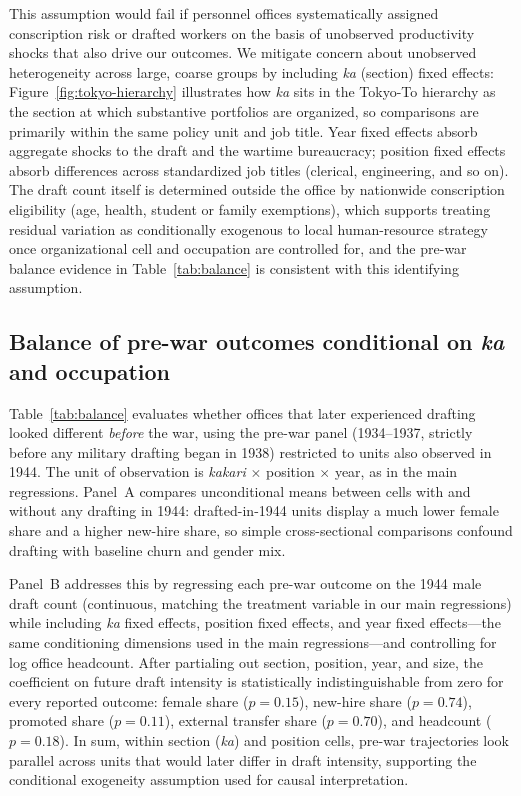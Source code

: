This assumption would fail if personnel offices systematically assigned conscription risk or drafted workers on the basis of unobserved productivity shocks that also drive our outcomes. We mitigate concern about unobserved heterogeneity across large, coarse groups by including \emph{ka} (section) fixed effects: Figure~\ref{fig:tokyo-hierarchy} illustrates how \emph{ka} sits in the Tokyo-To hierarchy as the section at which substantive portfolios are organized, so comparisons are primarily within the same policy unit and job title. Year fixed effects absorb aggregate shocks to the draft and the wartime bureaucracy; position fixed effects absorb differences across standardized job titles (clerical, engineering, and so on). The draft count itself is determined outside the office by nationwide conscription eligibility (age, health, student or family exemptions), which supports treating residual variation as conditionally exogenous to local human-resource strategy once organizational cell and occupation are controlled for, and the pre-war balance evidence in Table~\ref{tab:balance} is consistent with this identifying assumption.

\subsection{Balance of pre-war outcomes conditional on \emph{ka} and occupation}

Table~\ref{tab:balance} evaluates whether offices that later experienced drafting looked different \emph{before} the war, using the pre-war panel (1934--1937, strictly before any military drafting began in 1938) restricted to units also observed in 1944. The unit of observation is \emph{kakari} $\times$ position $\times$ year, as in the main regressions. Panel~A compares unconditional means between cells with and without any drafting in 1944: drafted-in-1944 units display a much lower female share and a higher new-hire share, so simple cross-sectional comparisons confound drafting with baseline churn and gender mix.

Panel~B addresses this by regressing each pre-war outcome on the 1944 male draft count (continuous, matching the treatment variable in our main regressions) while including \emph{ka} fixed effects, position fixed effects, and year fixed effects---the same conditioning dimensions used in the main regressions---and controlling for log office headcount. After partialing out section, position, year, and size, the coefficient on future draft intensity is statistically indistinguishable from zero for every reported outcome: female share ($p=0.15$), new-hire share ($p=0.74$), promoted share ($p=0.11$), external transfer share ($p=0.70$), and headcount ($p=0.18$). In sum, within section (\emph{ka}) and position cells, pre-war trajectories look parallel across units that would later differ in draft intensity, supporting the conditional exogeneity assumption used for causal interpretation.
